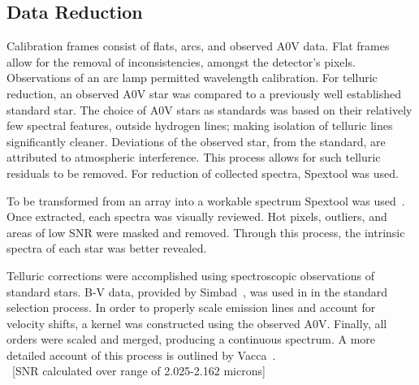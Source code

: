 \subsection{Data Reduction}

Calibration frames consist of flats, arcs, and observed A0V data.  Flat frames allow for the removal of inconsistencies, amongst the detector's pixels.  Observations of an arc lamp permitted wavelength calibration.  For telluric reduction, an observed A0V star was compared to a previously well established standard star.  The choice of A0V stars as standards was based on their relatively few spectral features, outside hydrogen lines; making isolation of telluric lines significantly cleaner.  
Deviations of the observed star, from the standard, are attributed to atmospheric interference.  This process allows for such telluric residuals to be removed.  For reduction of collected spectra, Spextool was used.


To be transformed from an array into a workable spectrum Spextool was used~\cite{Cushing_2004}.  Once extracted, each spectra was visually reviewed.  Hot pixels, outliers, and areas of low SNR were masked and removed.  Through this process, the intrinsic spectra of each star was better revealed.


Telluric corrections were accomplished using spectroscopic observations of standard stars. B-V data, provided by Simbad~\cite{simbad}, was used in in the standard selection process.
In order to properly scale emission lines and account for velocity shifts, a kernel was constructed using the observed A0V.  Finally, all orders were scaled and merged, producing a continuous spectrum.
A more detailed account of this process is outlined by Vacca~\cite{Vacca_2003}.\\



~[SNR calculated over range of 2.025-2.162 microns]\\